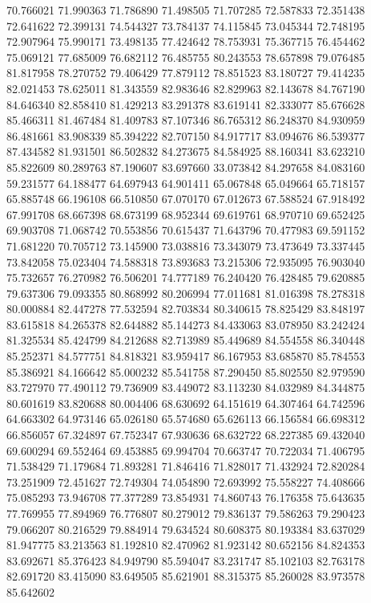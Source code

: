 70.766021
71.990363
71.786890
71.498505
71.707285
72.587833
72.351438
72.641622
72.399131
74.544327
73.784137
74.115845
73.045344
72.748195
72.907964
75.990171
73.498135
77.424642
78.753931
75.367715
76.454462
75.069121
77.685009
76.682112
76.485755
80.243553
78.657898
79.076485
81.817958
78.270752
79.406429
77.879112
78.851523
83.180727
79.414235
82.021453
78.625011
81.343559
82.983646
82.829963
82.143678
84.767190
84.646340
82.858410
81.429213
83.291378
83.619141
82.333077
85.676628
85.466311
81.467484
81.409783
87.107346
86.765312
86.248370
84.930959
86.481661
83.908339
85.394222
82.707150
84.917717
83.094676
86.539377
87.434582
81.931501
86.502832
84.273675
84.584925
88.160341
83.623210
85.822609
80.289763
87.190607
83.697660
33.073842
84.297658
84.083160
59.231577
64.188477
64.697943
64.901411
65.067848
65.049664
65.718157
65.885748
66.196108
66.510850
67.070170
67.012673
67.588524
67.918492
67.991708
68.667398
68.673199
68.952344
69.619761
68.970710
69.652425
69.903708
71.068742
70.553856
70.615437
71.643796
70.477983
69.591152
71.681220
70.705712
73.145900
73.038816
73.343079
73.473649
73.337445
73.842058
75.023404
74.588318
73.893683
73.215306
72.935095
76.903040
75.732657
76.270982
76.506201
74.777189
76.240420
76.428485
79.620885
79.637306
79.093355
80.868992
80.206994
77.011681
81.016398
78.278318
80.000884
82.447278
77.532594
82.703834
80.340615
78.825429
83.848197
83.615818
84.265378
82.644882
85.144273
84.433063
83.078950
83.242424
81.325534
85.424799
84.212688
82.713989
85.449689
84.554558
86.340448
85.252371
84.577751
84.818321
83.959417
86.167953
83.685870
85.784553
85.386921
84.166642
85.000232
85.541758
87.290450
85.802550
82.979590
83.727970
77.490112
79.736909
83.449072
83.113230
84.032989
84.344875
80.601619
83.820688
80.004406
68.630692
64.151619
64.307464
64.742596
64.663302
64.973146
65.026180
65.574680
65.626113
66.156584
66.698312
66.856057
67.324897
67.752347
67.930636
68.632722
68.227385
69.432040
69.600294
69.552464
69.453885
69.994704
70.663747
70.722034
71.406795
71.538429
71.179684
71.893281
71.846416
71.828017
71.432924
72.820284
73.251909
72.451627
72.749304
74.054890
72.693992
75.558227
74.408666
75.085293
73.946708
77.377289
73.854931
74.860743
76.176358
75.643635
77.769955
77.894969
76.776807
80.279012
79.836137
79.586263
79.290423
79.066207
80.216529
79.884914
79.634524
80.608375
80.193384
83.637029
81.947775
83.213563
81.192810
82.470962
81.923142
80.652156
84.824353
83.692671
85.376423
84.949790
85.594047
83.231747
85.102103
82.763178
82.691720
83.415090
83.649505
85.621901
88.315375
85.260028
83.973578
85.642602
